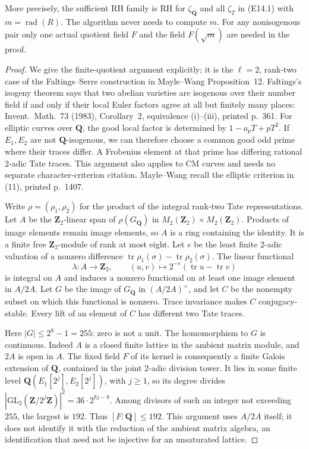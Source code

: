 More precisely, the sufficient RH family is
RH for $\zeta_{\mathbf Q}$ and
all $\zeta_T$ in (E14.1) with
$m=\operatorname{rad}(R)$.
The algorithm never needs to compute $m$.
For any nonisogenous pair only one actual
quotient field $F$ and the field $F(\sqrt m)$
are needed in the proof.

\begin{proof}
We give the finite-quotient argument explicitly;
it is the $\ell=2$, rank-two case of the
Faltings--Serre construction in Mayle--Wang
Proposition~12.
Faltings's isogeny theorem says that two abelian
varieties are isogenous over their number field
if and only if their local Euler factors agree
at all but finitely many places: Invent.\ Math.~73
(1983), Corollary~2, equivalence (i)--(iii),
printed p.~361. For elliptic curves over
$\mathbf Q$, the good local factor is determined
by $1-a_pT+pT^2$. If $E_1,E_2$ are not
$\mathbf Q$-isogenous, we can therefore choose
a common good odd prime where their traces differ.
A Frobenius element at that prime has differing
rational $2$-adic Tate traces. This argument also
applies to CM curves and needs no separate
character-criterion citation. Mayle--Wang recall
the elliptic criterion in (11), printed p.~1407.

Write $\rho=(\rho_1,\rho_2)$ for the product
of the integral rank-two Tate representations.
Let $A$ be the $\mathbf Z_2$-linear span of
$\rho(G_{\mathbf Q})$ in
$M_2(\mathbf Z_2)\times M_2(\mathbf Z_2)$.
Products of image elements remain image elements,
so $A$ is a ring containing the identity.
It is a finite free $\mathbf Z_2$-module of rank
at most eight. Let $e$ be the least finite
$2$-adic valuation of a nonzero difference
$\operatorname{tr}\rho_1(\sigma)-
 \operatorname{tr}\rho_2(\sigma)$.
The linear functional
\[
 \lambda:A\longrightarrow\mathbf Z_2,\qquad
 (u,v)\longmapsto
             2^{-e}(\operatorname{tr}u-\operatorname{tr}v)
 \tag{E16.3}
\]
is integral on $A$ and induces a nonzero functional
on at least one image element in $A/2A$.
Let $G$ be the image of $G_{\mathbf Q}$ in
$(A/2A)^\times$, and let $C$ be the nonempty
subset on which this functional is nonzero.
Trace invariance makes $C$ conjugacy-stable.
Every lift of an element of $C$ has different
two Tate traces.

Here $|G|\le2^8-1=255$: zero is not a unit.
The homomorphism to $G$ is continuous.
Indeed $A$ is a closed finite lattice in the
ambient matrix module, and $2A$ is open in $A$.
The fixed field $F$ of its kernel is consequently
a finite Galois extension of $\mathbf Q$,
contained in the joint $2$-adic division tower.
It lies in some finite level
$\mathbf Q(E_1[2^j],E_2[2^j])$, with $j\ge1$, so its degree
divides
$|\mathrm{GL}_2(\mathbf Z/2^j\mathbf Z)|^2
 =36\cdot2^{8j-8}$.
Among divisors of such an integer not exceeding
$255$, the largest is $192$.
Thus $[F:\mathbf Q]\le192$.
This argument uses $A/2A$ itself; it does not
identify it with the reduction of the ambient
matrix algebra, an identification that need
not be injective for an unsaturated lattice.


\end{proof}
